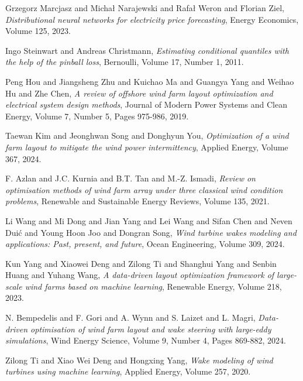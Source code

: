 \documentclass[preprint,12pt]{elsarticle}
\begin{document}
\begin{thebibliography}{00}
Grzegorz Marcjasz and Michał Narajewski and Rafał Weron and Florian Ziel,
\textit{Distributional neural networks for electricity price forecasting},
Energy Economics,
Volume 125,
2023.

Ingo Steinwart and Andreas Christmann,
\textit{Estimating conditional quantiles with the help of the pinball loss},
Bernoulli,
Volume 17,
Number 1,
2011.

Peng Hou and Jiangsheng Zhu and Kuichao Ma and Guangya Yang and Weihao Hu and Zhe Chen,
\textit{A review of offshore wind farm layout optimization and electrical system design methods},
Journal of Modern Power Systems and Clean Energy,
Volume 7,
Number 5,
Pages 975-986,
2019.

Taewan Kim and Jeonghwan Song and Donghyun You,
\textit{Optimization of a wind farm layout to mitigate the wind power intermittency},
Applied Energy,
Volume 367,
2024.

F. Azlan and J.C. Kurnia and B.T. Tan and M.-Z. Ismadi,
\textit{Review on optimisation methods of wind farm array under three classical wind condition problems},
Renewable and Sustainable Energy Reviews,
Volume 135,
2021.

Li Wang and Mi Dong and Jian Yang and Lei Wang and Sifan Chen and Neven Duić and Young Hoon Joo and Dongran Song,
\textit{Wind turbine wakes modeling and applications: Past, present, and future},
Ocean Engineering,
Volume 309,
2024.

Kun Yang and Xiaowei Deng and Zilong Ti and Shanghui Yang and Senbin Huang and Yuhang Wang,
\textit{A data-driven layout optimization framework of large-scale wind farms based on machine learning},
Renewable Energy,
Volume 218,
2023.

N. Bempedelis and F. Gori and A. Wynn and S. Laizet and L. Magri,
\textit{Data-driven optimisation of wind farm layout and wake steering with large-eddy simulations},
Wind Energy Science,
Volume 9,
Number 4,
Pages 869-882,
2024.

Zilong Ti and Xiao Wei Deng and Hongxing Yang,
\textit{Wake modeling of wind turbines using machine learning},
Applied Energy,
Volume 257,
2020.


\end{thebibliography}
\end{document}
